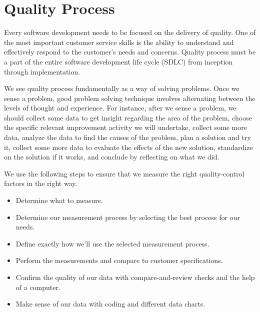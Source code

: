 \documentclass{article}%
\begin{document}
\section{Quality Process}
Every software development needs to be focused on the delivery of quality. One of the most important customer service skills is the ability to understand and effectively respond to the customer’s needs and concerns. Quality process must be a part of the entire software development life cycle (SDLC) from inception through implementation.

We see quality process fundamentally as a way of solving problems. Once we sense a problem, good problem solving technique involves alternating between the levels of thought and experience. For instance, after we sense a problem, we should collect some data to get insight regarding the area of the problem,
choose the specific relevant improvement activity we will undertake, collect some more
data, analyze the data to find the causes of the problem, plan a solution and try it, collect
some more data to evaluate the effects of the new solution, standardize on the solution if
it works, and conclude by reflecting on what we did.

We use the following steps to ensure that we measure the right quality-control factors in the right way.
\begin{itemize}
\item Determine what to measure.
\item Determine our measurement process by selecting the best process for our needs.
\item Define exactly how we'll use the selected measurement process.
\item Perform the measurements and compare to customer specifications.
\item Confirm the quality of our data with compare-and-review checks and the help of a computer.
\item Make sense of our data with coding and different data charts.
\end{itemize}
\end{document}
